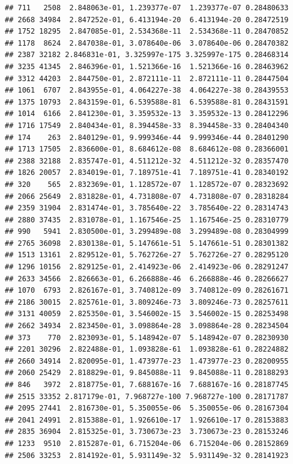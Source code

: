 \documentclass[
]{article}
\begin{document}
\begin{verbatim}
## 711   2508  2.848063e-01, 1.239377e-07  1.239377e-07 0.28480633
## 2668 34984  2.847252e-01, 6.413194e-20  6.413194e-20 0.28472519
## 1752 18295  2.847085e-01, 2.534368e-11  2.534368e-11 0.28470852
## 1178  8624  2.847038e-01, 3.078640e-06  3.078640e-06 0.28470382
## 2387 32182 2.846831e-01, 3.325997e-175 3.325997e-175 0.28468314
## 3235 41345  2.846396e-01, 1.521366e-16  1.521366e-16 0.28463962
## 3312 44203  2.844750e-01, 2.872111e-11  2.872111e-11 0.28447504
## 1061  6707  2.843955e-01, 4.064227e-38  4.064227e-38 0.28439553
## 1375 10793  2.843159e-01, 6.539588e-81  6.539588e-81 0.28431591
## 1014  6166  2.841230e-01, 3.359532e-13  3.359532e-13 0.28412296
## 1716 17549  2.840434e-01, 8.394458e-33  8.394458e-33 0.28404340
## 174    263  2.840129e-01, 9.999346e-44  9.999346e-44 0.28401290
## 1713 17505  2.836600e-01, 8.684612e-08  8.684612e-08 0.28366001
## 2388 32188  2.835747e-01, 4.511212e-32  4.511212e-32 0.28357470
## 1826 20057  2.834019e-01, 7.189751e-41  7.189751e-41 0.28340192
## 320    565  2.832369e-01, 1.128572e-07  1.128572e-07 0.28323692
## 2066 25649  2.831828e-01, 4.731808e-07  4.731808e-07 0.28318284
## 2359 31904  2.831474e-01, 3.785640e-22  3.785640e-22 0.28314743
## 2880 37435  2.831078e-01, 1.167546e-25  1.167546e-25 0.28310779
## 990   5941  2.830500e-01, 3.299489e-08  3.299489e-08 0.28304999
## 2765 36098  2.830138e-01, 5.147661e-51  5.147661e-51 0.28301382
## 1513 13161  2.829512e-01, 5.762726e-27  5.762726e-27 0.28295120
## 1296 10156  2.829125e-01, 2.414923e-06  2.414923e-06 0.28291247
## 2633 34566  2.826663e-01, 6.266888e-46  6.266888e-46 0.28266627
## 1070  6793  2.826167e-01, 3.740812e-09  3.740812e-09 0.28261671
## 2186 30015  2.825761e-01, 3.809246e-73  3.809246e-73 0.28257611
## 3131 40059  2.825350e-01, 3.546002e-15  3.546002e-15 0.28253498
## 2662 34934  2.823450e-01, 3.098864e-28  3.098864e-28 0.28234504
## 373    770  2.823093e-01, 5.148942e-07  5.148942e-07 0.28230930
## 2201 30296  2.822488e-01, 1.093828e-61  1.093828e-61 0.28224882
## 2660 34914  2.820095e-01, 1.473977e-23  1.473977e-23 0.28200955
## 2060 25429  2.818829e-01, 9.845088e-11  9.845088e-11 0.28188293
## 846   3972  2.818775e-01, 7.688167e-16  7.688167e-16 0.28187745
## 2515 33352 2.817179e-01, 7.968727e-100 7.968727e-100 0.28171787
## 2095 27441  2.816730e-01, 5.350055e-06  5.350055e-06 0.28167304
## 2041 24991  2.815388e-01, 1.926610e-17  1.926610e-17 0.28153883
## 2835 36904  2.815325e-01, 3.730673e-23  3.730673e-23 0.28153246
## 1233  9510  2.815287e-01, 6.715204e-06  6.715204e-06 0.28152869
## 2506 33253  2.814192e-01, 5.931149e-32  5.931149e-32 0.28141923

\end{verbatim}
\end{document}
